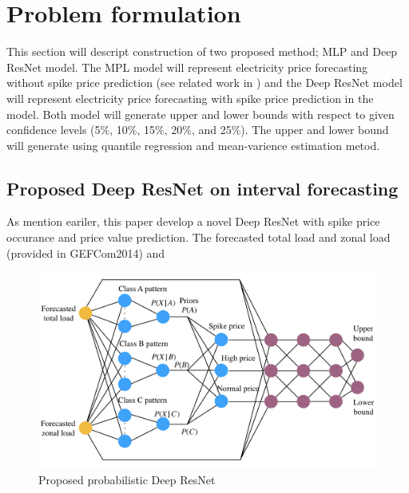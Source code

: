 \documentclass[review]{elsarticle}
\begin{document}
  \section{Problem formulation}
    This section will descript construction of two proposed method; MLP and Deep ResNet model.
    The MPL model will represent electricity price forecasting without spike price prediction (see related work in \cite{Dudek2016}) and the Deep ResNet model will represent electricity price forecasting with spike price prediction in the model.
    Both model will generate upper and lower bounds with respect to given confidence levels (5$\%$, 10$\%$, 15$\%$, 20$\%$, and 25$\%$).
    The upper and lower bound will generate using quantile regression and mean-varience estimation metod.

    \subsection{Proposed Deep ResNet on interval forecasting}
      As mention eariler, this paper develop a novel Deep ResNet with spike price occurance and price  value prediction.
      The forecasted total load and zonal load (provided in GEFCom2014) and

      \begin{figure}[H]
        \includegraphics[width=12cm]{proposed_PDRNN}
        \caption{Proposed probabilistic Deep ResNet}
        \label{Fig:proposed_PDRNN}
        \centering
      \end{figure}
\end{document}

